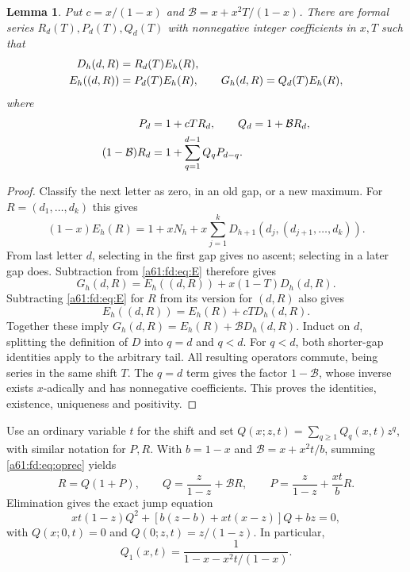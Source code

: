 \documentclass[11pt,letterpaper]{article}
\numberwithin{equation}{section}
\newtheorem{lemma}[theorem]{Lemma}
\theoremstyle{remark}\newtheorem{remark}[theorem]{Remark}
\begin{document}
\begin{lemma}\label{a61:fd:lem:operator}
Put $c=x/(1-x)$ and $\mathcal B=x+x^2T/(1-x)$. There are formal series $R_d(T),P_d(T),Q_d(T)$ with nonnegative integer coefficients in $x,T$ such that
\begin{align}
 D_h(d,R)&=R_d(T)E_h(R),\notag\\
 E_h((d,R))&=P_d(T)E_h(R),\qquad
 G_h(d,R)=Q_d(T)E_h(R),\label{a61:fd:eq:op}
\end{align}
where
\begin{align}
 P_d&=1+cTR_d,\qquad Q_d=1+\mathcal B R_d,\notag\\
 (1-\mathcal B)R_d&=1+\sum_{q=1}^{d-1}Q_qP_{d-q}.
 \label{a61:fd:eq:oprec}
\end{align}
\end{lemma}
\begin{proof}
Classify the next letter as zero, in an old gap, or a new maximum. For $R=(d_1,\ldots,d_k)$ this gives
\begin{equation}\label{a61:fd:eq:E}
 (1-x)E_h(R)=1+xN_h+x\sum_{j=1}^kD_{h+1}(d_j,(d_{j+1},\ldots,d_k)).
\end{equation}
From last letter $d$, selecting in the first gap gives no ascent; selecting in a later gap does. Subtraction from \eqref{a61:fd:eq:E} therefore gives
\[
 G_h(d,R)=E_h((d,R))+x(1-T)D_h(d,R).
\]
Subtracting \eqref{a61:fd:eq:E} for $R$ from its version for $(d,R)$ also gives
\[
 E_h((d,R))=E_h(R)+cTD_h(d,R).
\]
Together these imply $G_h(d,R)=E_h(R)+\mathcal B D_h(d,R)$. Induct on $d$, splitting the definition of $D$ into $q=d$ and $q<d$. For $q<d$, both shorter-gap identities apply to the arbitrary tail. All resulting operators commute, being series in the same shift $T$. The $q=d$ term gives the factor $1-\mathcal B$, whose inverse exists $x$-adically and has nonnegative coefficients. This proves the identities, existence, uniqueness and positivity.
\end{proof}

Use an ordinary variable $t$ for the shift and set $Q(x;z,t)=\sum_{q\ge1}Q_q(x,t)z^q$, with similar notation for $P,R$. With $b=1-x$ and $\mathcal B=x+x^2t/b$, summing \eqref{a61:fd:eq:oprec} yields
\[
 R=Q(1+P),\qquad Q=\frac{z}{1-z}+\mathcal B R,
 \qquad P=\frac{z}{1-z}+\frac{xt}{b}R.
\]
Elimination gives the exact jump equation
\begin{equation}\label{a61:fd:eq:Qquad}
 xt(1-z)Q^2+[b(z-b)+xt(x-z)]Q+bz=0,
\end{equation}
with $Q(x;0,t)=0$ and $Q(0;z,t)=z/(1-z)$. In particular,
\begin{equation}\label{a61:fd:eq:Q1}
 Q_1(x,t)=\frac1{1-x-x^2t/(1-x)}.
\end{equation}
\end{document}
